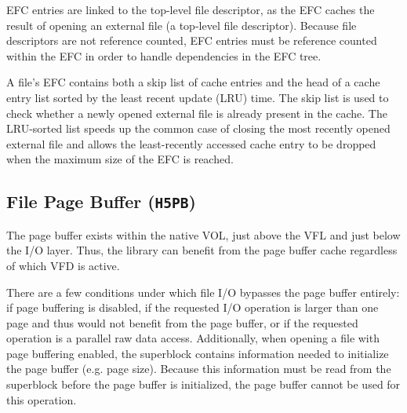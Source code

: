 \begin{itemize}
EFC entries are linked to the top-level file descriptor, as the EFC caches the result of opening an external file (a top-level file descriptor). Because file descriptors are not reference counted, EFC entries must be reference counted within the EFC in order to handle dependencies in the EFC tree.

A file's EFC contains both a skip list of cache entries and the head of a cache entry list sorted by the least recent update (LRU) time. The skip list is used to check whether a newly opened external file is already present in the cache. The LRU-sorted list speeds up the common case of closing the most recently opened external file and allows the least-recently accessed cache entry to be dropped when the maximum size of the EFC is reached.

\end{itemize}


\subsection{File Page Buffer (\texttt{H5PB})}\label{sec:H5PB}



The page buffer exists within the native VOL, just above the VFL and just below the I/O layer. Thus, the library can benefit from the page buffer cache regardless of which VFD is active. 

There are a few conditions under which file I/O bypasses the page buffer entirely: if page buffering is disabled, if the requested I/O operation is larger than one page and thus would not benefit from the page buffer, or if the requested operation is a parallel raw data access. Additionally, when opening a file with page buffering enabled, the superblock contains information needed to initialize the page buffer (e.g. page size). Because this information must be read from the superblock before the page buffer is initialized, the page buffer cannot be used for this operation.

